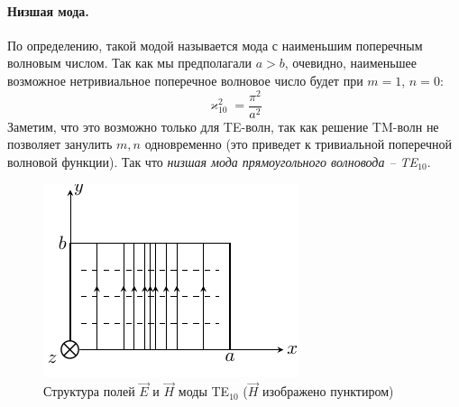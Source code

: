 \documentclass[a4paper,14pt]{extarticle}
\begin{document}
\paragraph{Низшая мода.} По определению, такой модой называется мода с наименьшим поперечным волновым числом. Так как мы предполагали $a>b$, очевидно, наименьшее возможное нетривиальное поперечное волновое число будет при $m=1$, $n=0$:
\begin{equation}
	\varkappa^2_{10} = \frac{\pi^2}{a^2}
\end{equation}
Заметим, что это возможно только для TE-волн, так как решение TM-волн не позволяет занулить $m,n$ одновременно (это приведет к тривиальной поперечной волновой функции). Так что \textit{низшая мода прямоугольного волновода -- TE${}_{10}$}.
\begin{figure}[h!]
	\centering
	\includegraphics[scale=1.5]{img/lect4_ris8} 
	\caption{Структура полей $\vec{E}$ и $\vec{H}$ моды TE${}_{10}$ ($\vec{H}$ изображено пунктиром)}
	\label{fig:lect4:8}
\end{figure}
\end{document}
